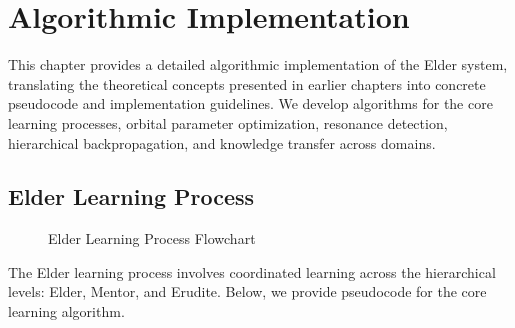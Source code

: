 \chapter{Algorithmic Implementation}

\begin{tcolorbox}[colback=PureBlue!5!white,colframe=PureBlue!75!black,title=Chapter Summary]
This chapter provides a detailed algorithmic implementation of the Elder system, translating the theoretical concepts presented in earlier chapters into concrete pseudocode and implementation guidelines. We develop algorithms for the core learning processes, orbital parameter optimization, resonance detection, hierarchical backpropagation, and knowledge transfer across domains.
\end{tcolorbox}

\section{Elder Learning Process}

\begin{figure}[htbp]
\centering

\caption{Elder Learning Process Flowchart}
\label{fig:learning_process_flowchart}
\end{figure}

The Elder learning process involves coordinated learning across the hierarchical levels: Elder, Mentor, and Erudite. Below, we provide pseudocode for the core learning algorithm.

